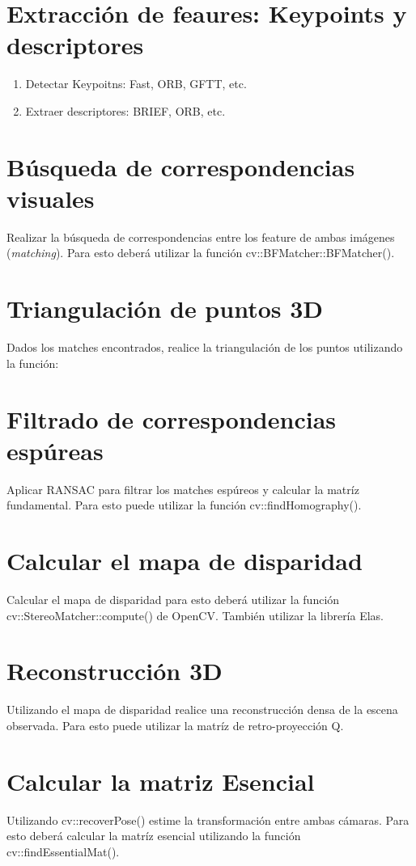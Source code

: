 \documentclass[tp]{lcc}
\begin{document}
\section{Extracción de feaures: Keypoints y descriptores}

\begin{enumerate}
	\item Detectar Keypoitns: Fast, ORB, GFTT, etc. 
	\item Extraer descriptores: BRIEF, ORB, etc.
\end{enumerate}

\section{Búsqueda de correspondencias visuales}
Realizar la búsqueda de correspondencias entre los feature de ambas imágenes (\emph{matching}). Para esto deberá utilizar la función cv::BFMatcher::BFMatcher(). 

\section{Triangulación de puntos 3D}
Dados los matches encontrados, realice la triangulación de los puntos utilizando la función: 

\section{Filtrado de correspondencias espúreas}
Aplicar RANSAC para filtrar los matches espúreos y calcular la matríz fundamental. Para esto puede utilizar la función cv::findHomography().

\section{Calcular el mapa de disparidad}
Calcular el mapa de disparidad para esto  deberá utilizar la función cv::StereoMatcher::compute() de OpenCV. También utilizar la librería Elas.

\section{Reconstrucción 3D}
Utilizando el mapa de disparidad realice una reconstrucción densa de la escena observada. Para esto puede utilizar la matríz de retro-proyección Q.

\section{Calcular la matriz Esencial}
Utilizando cv::recoverPose() estime la transformación entre ambas cámaras. Para esto deberá calcular la matríz esencial utilizando la función cv::findEssentialMat().


\printbibliography
\end{document}
